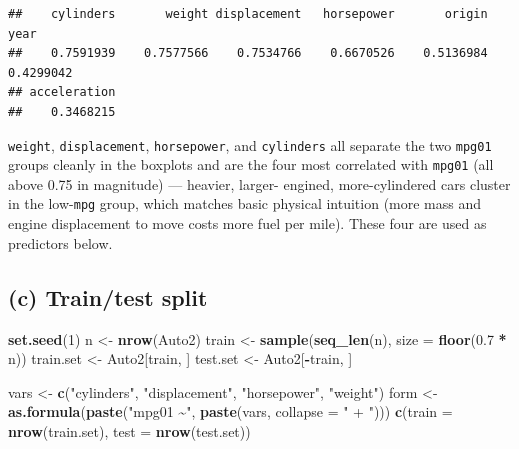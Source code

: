 \documentclass[
  11pt,
]{article}
\newenvironment{Shaded}{\begin{snugshade}}{\end{snugshade}}
\newcommand{\AttributeTok}[1]{\textcolor[rgb]{0.13,0.29,0.53}{#1}}
\newcommand{\DecValTok}[1]{\textcolor[rgb]{0.00,0.00,0.81}{#1}}
\newcommand{\FloatTok}[1]{\textcolor[rgb]{0.00,0.00,0.81}{#1}}
\newcommand{\FunctionTok}[1]{\textcolor[rgb]{0.13,0.29,0.53}{\textbf{#1}}}
\newcommand{\NormalTok}[1]{#1}
\newcommand{\OtherTok}[1]{\textcolor[rgb]{0.56,0.35,0.01}{#1}}
\newcommand{\SpecialCharTok}[1]{\textcolor[rgb]{0.81,0.36,0.00}{\textbf{#1}}}
\newcommand{\StringTok}[1]{\textcolor[rgb]{0.31,0.60,0.02}{#1}}
\begin{document}
\begin{verbatim}
##    cylinders       weight displacement   horsepower       origin         year 
##    0.7591939    0.7577566    0.7534766    0.6670526    0.5136984    0.4299042 
## acceleration 
##    0.3468215
\end{verbatim}

\texttt{weight}, \texttt{displacement}, \texttt{horsepower}, and
\texttt{cylinders} all separate the two \texttt{mpg01} groups cleanly in
the boxplots and are the four most correlated with \texttt{mpg01} (all
above 0.75 in magnitude) --- heavier, larger- engined, more-cylindered
cars cluster in the low-\texttt{mpg} group, which matches basic physical
intuition (more mass and engine displacement to move costs more fuel per
mile). These four are used as predictors below.

\subsection{(c) Train/test split}\label{c-traintest-split}

\begin{Shaded}
\begin{Highlighting}[]
\FunctionTok{set.seed}\NormalTok{(}\DecValTok{1}\NormalTok{)}
\NormalTok{n }\OtherTok{\textless{}{-}} \FunctionTok{nrow}\NormalTok{(Auto2)}
\NormalTok{train }\OtherTok{\textless{}{-}} \FunctionTok{sample}\NormalTok{(}\FunctionTok{seq\_len}\NormalTok{(n), }\AttributeTok{size =} \FunctionTok{floor}\NormalTok{(}\FloatTok{0.7} \SpecialCharTok{*}\NormalTok{ n))}
\NormalTok{train.set }\OtherTok{\textless{}{-}}\NormalTok{ Auto2[train, ]}
\NormalTok{test.set }\OtherTok{\textless{}{-}}\NormalTok{ Auto2[}\SpecialCharTok{{-}}\NormalTok{train, ]}

\NormalTok{vars }\OtherTok{\textless{}{-}} \FunctionTok{c}\NormalTok{(}\StringTok{"cylinders"}\NormalTok{, }\StringTok{"displacement"}\NormalTok{, }\StringTok{"horsepower"}\NormalTok{, }\StringTok{"weight"}\NormalTok{)}
\NormalTok{form }\OtherTok{\textless{}{-}} \FunctionTok{as.formula}\NormalTok{(}\FunctionTok{paste}\NormalTok{(}\StringTok{"mpg01 \textasciitilde{}"}\NormalTok{, }\FunctionTok{paste}\NormalTok{(vars, }\AttributeTok{collapse =} \StringTok{" + "}\NormalTok{)))}
\FunctionTok{c}\NormalTok{(}\AttributeTok{train =} \FunctionTok{nrow}\NormalTok{(train.set), }\AttributeTok{test =} \FunctionTok{nrow}\NormalTok{(test.set))}
\end{Highlighting}
\end{Shaded}
\end{document}
